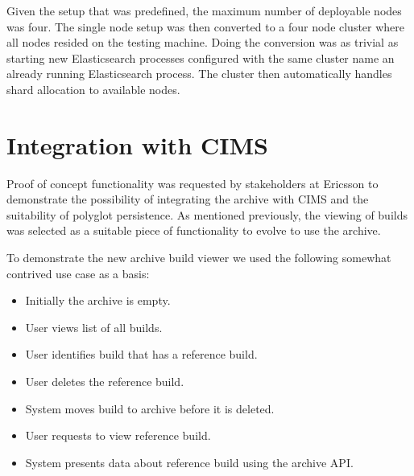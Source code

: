 Given the setup that was predefined, the maximum number of deployable nodes was four. The single node setup was then converted to a four node cluster where all nodes resided on the testing machine. Doing the conversion was as trivial as starting new Elasticsearch processes configured with the same cluster name an already running Elasticsearch process. The cluster then automatically handles shard allocation to available nodes.

%
%

\section{Integration with CIMS}
Proof of concept functionality was requested by stakeholders at Ericsson to demonstrate the possibility of integrating the archive with CIMS and the suitability of polyglot persistence. As mentioned previously, the viewing of builds was selected as a suitable piece of functionality to evolve to use the archive. 

To demonstrate the new archive build viewer we used the following somewhat contrived use case as a basis:
\begin{itemize}
\item Initially the archive is empty.
\item User views list of all builds.
\item User identifies build that has a reference build.
\item User deletes the reference build.
\item System moves build to archive before it is deleted.
\item User requests to view reference build.
\item System presents data about reference build using the archive API.
\end{itemize}

